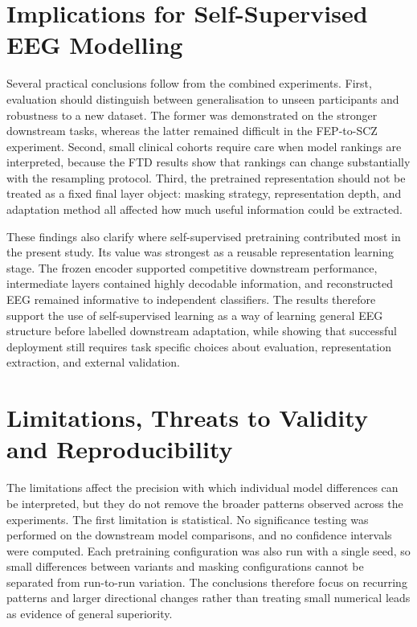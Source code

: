\section{Implications for Self-Supervised EEG Modelling}\label{sec:d_implications}

Several practical conclusions follow from the combined experiments. First, evaluation should distinguish between generalisation to unseen participants and robustness to a new dataset. The former was demonstrated on the stronger downstream tasks, whereas the latter remained difficult in the FEP-to-SCZ experiment. Second, small clinical cohorts require care when model rankings are interpreted, because the FTD results show that rankings can change substantially with the resampling protocol. Third, the pretrained representation should not be treated as a fixed final layer object: masking strategy, representation depth, and adaptation method all affected how much useful information could be extracted.

These findings also clarify where self-supervised pretraining contributed most in the present study. Its value was strongest as a reusable representation learning stage. The frozen encoder supported competitive downstream performance, intermediate layers contained highly decodable information, and reconstructed EEG remained informative to independent classifiers. The results therefore support the use of self-supervised learning as a way of learning general EEG structure before labelled downstream adaptation, while showing that successful deployment still requires task specific choices about evaluation, representation extraction, and external validation.

\section{Limitations, Threats to Validity and Reproducibility}\label{sec:d_limitations}

The limitations affect the precision with which individual model differences can be interpreted, but they do not remove the broader patterns observed across the experiments. The first limitation is statistical. No significance testing was performed on the downstream model comparisons, and no confidence intervals were computed. Each pretraining configuration was also run with a single seed, so small differences between variants and masking configurations cannot be separated from run-to-run variation. The conclusions therefore focus on recurring patterns and larger directional changes rather than treating small numerical leads as evidence of general superiority.

